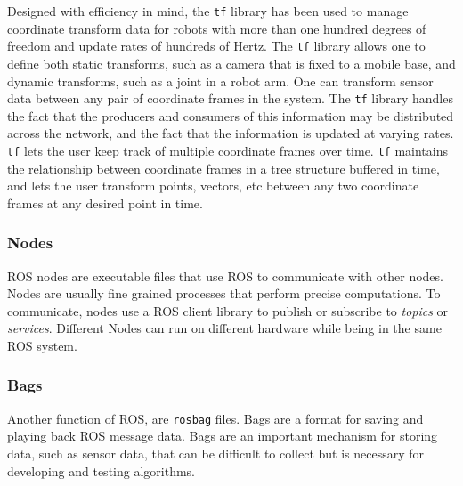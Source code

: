 Designed with efficiency in mind, the \texttt{tf} library has been used to manage coordinate transform data for robots with more than one hundred degrees of freedom and update rates of hundreds of Hertz. The \texttt{tf} library allows one to define both static transforms, such as a camera that is fixed to a mobile base, and dynamic transforms, such as a joint in a robot arm. One can transform sensor data between any pair of coordinate frames in the system. The \texttt{tf} library handles the fact that the producers and consumers of this information may be distributed across the network, and the fact that the information is updated at varying rates.\\
\texttt{tf} lets the user keep track of multiple coordinate frames over time. \texttt{tf} maintains the relationship between coordinate frames in a tree structure buffered in time, and lets the user transform points, vectors, etc between any two coordinate frames at any desired point in time.

\subsubsection*{Nodes}
\ac{ROS} nodes are executable files that use \ac{ROS} to communicate with other nodes. Nodes are usually fine grained processes that perform precise computations. To communicate, nodes use a ROS client library to publish or subscribe to \emph{topics} or \emph{services}. Different Nodes can run on different hardware while being in the same \ac{ROS} system.

\subsubsection*{Bags}
Another function of \ac{ROS}, are \lstinline|rosbag| files. Bags are a format for saving and playing back ROS message data. Bags are an important mechanism for storing data, such as sensor data, that can be difficult to collect but is necessary for developing and testing algorithms.


